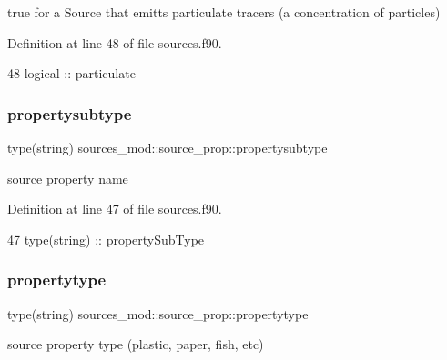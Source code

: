 true for a Source that emitts particulate tracers (a concentration of particles) 



Definition at line 48 of file sources.\+f90.


\begin{DoxyCode}
48         \textcolor{keywordtype}{logical} :: particulate
\end{DoxyCode}
\mbox{\label{structsources__mod_1_1source__prop_aa1f7e8b3d4cb5fb2d53686524c192a91}} 
\subsubsection{\texorpdfstring{propertysubtype}{propertysubtype}}
{\footnotesize\ttfamily type(string) sources\+\_\+mod\+::source\+\_\+prop\+::propertysubtype\hspace{0.3cm}{\ttfamily [private]}}



source property name 



Definition at line 47 of file sources.\+f90.


\begin{DoxyCode}
47         \textcolor{keywordtype}{type}(string) :: propertySubType
\end{DoxyCode}
\mbox{\label{structsources__mod_1_1source__prop_ad1b7ee214a68f28d2298847ae63154cf}} 
\subsubsection{\texorpdfstring{propertytype}{propertytype}}
{\footnotesize\ttfamily type(string) sources\+\_\+mod\+::source\+\_\+prop\+::propertytype\hspace{0.3cm}{\ttfamily [private]}}



source property type (plastic, paper, fish, etc) 



